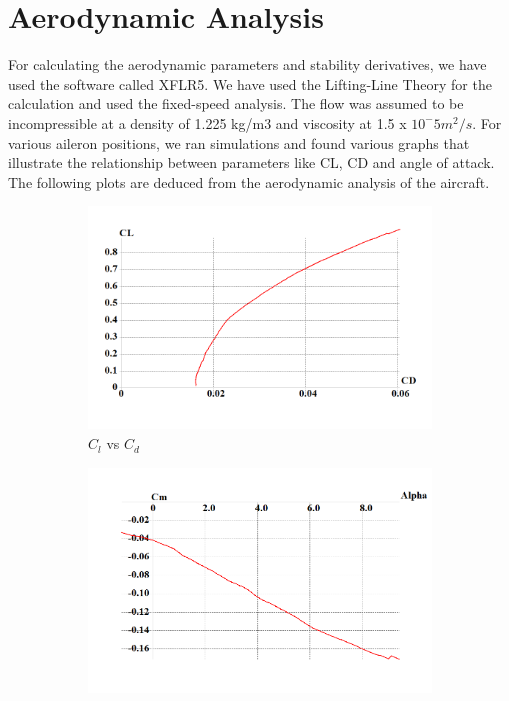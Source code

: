 \section{Aerodynamic Analysis}
For calculating the aerodynamic parameters and stability derivatives, we have used the software called XFLR5.
We have used the Lifting-Line Theory for the calculation and used the fixed-speed analysis. The flow was assumed to be incompressible at a density of 1.225 kg/m3 and viscosity at 1.5 x $10^-5 m^2/s$.
For various aileron positions, we ran simulations and found various graphs that illustrate the relationship between parameters like CL, CD and angle of attack.
The following plots are deduced from the aerodynamic analysis of the aircraft.
\begin{figure}[H]
\begin{subfigure}{0.6\textwidth}
\includegraphics[width = \linewidth]{cl_vs_cd.png}
\caption{$C_l$ vs $C_d$}
\end{subfigure}
\begin{subfigure}{0.6\textwidth}
\includegraphics[width = \linewidth]{cm_alpha.png}

\end{subfigure}
\end{figure}
